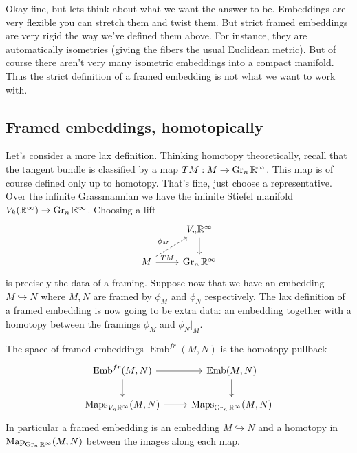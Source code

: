 \documentclass{amsart}
\DeclareMathOperator{\Emb}{Emb}
\begin{document}
Okay fine, but lets think about what we want the answer to be. Embeddings are very flexible
you can stretch them and twist them.
But strict framed embeddings are very rigid the way we've defined them above.
For instance, they are automatically isometries (giving the fibers the usual Euclidean metric).
But of course there aren't very many isometric embeddings into a compact manifold.
Thus the strict definition of a framed embedding is not what we want to work with.

\subsection{Framed embeddings, homotopically}

Let's consider a more lax definition. Thinking homotopy theoretically,
recall that the tangent bundle is classified by a map $TM: M\to \operatorname{Gr}_n\mathbb{R}^\infty$. This map is
of course defined only up to homotopy. That's fine, just choose a representative. Over
the infinite Grassmannian we have the infinite Stiefel manifold $V_k(\mathbb{R}^\infty)\to\operatorname{Gr}_n\mathbb{R}^\infty$.
Choosing a lift
\begin{equation*}
    \begin{tikzcd}
        \; & V_n\R^\infty \dar \\
        M \rar{TM}\urar[dashed]{\phi_M} & \Gr_n\R^\infty
    \end{tikzcd}
\end{equation*}
is precisely the data of a framing. 
Suppose now that we have an embedding $M\hookrightarrow N$ where $M,N$ are framed by
$\phi_M$ and $\phi_N$ respectively.
The lax definition of a framed embedding is now going to be extra data: an embedding
together with a homotopy between the framings $\phi_M$ and $\phi_N|_M$.

\begin{definition}
    The space of framed embeddings $\Emb^{fr}(M,N)$ is the homotopy pullback
    \begin{equation*}
        \begin{tikzcd}
            \Emb^{fr}(M,N) \rar\dar & \Emb(M,N)\dar  \\
            \Maps_{V_n\R^\infty}(M,N) \rar & \Maps_{\Gr_n\R^\infty}(M,N)
        \end{tikzcd}
    \end{equation*}
    In particular a framed embedding is an embedding $M\hookrightarrow N$ and
    a homotopy in $\operatorname*{Map}_{\operatorname{Gr}_n\mathbb{R}^\infty}(M,N)$ between the images along each map.
\end{definition}
\end{document}
